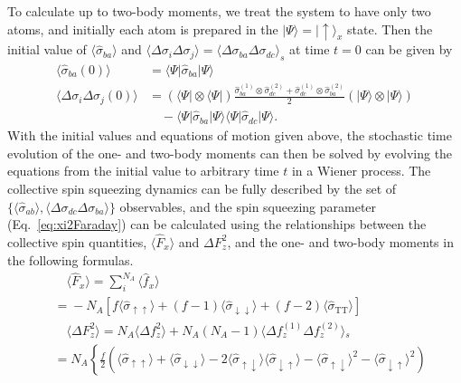 \documentclass[aps,pra,twocolumn,superscriptaddress]{revtex4-1} %
\def\bra#1{\langle{#1}\rvert}%
\def\ket#1{\lvert{#1}\rangle}%
\newcommand{\nn}{\nonumber}
\newcommand{\expect}[1]{\big\langle #1 \big\rangle}
\newcommand{\sigmauu}{\hat{\sigma}_{\uparrow\uparrow}}
\newcommand{\sigmaud}{\hat{\sigma}_{\uparrow\downarrow}}
\newcommand{\sigmadu}{\hat{\sigma}_{\downarrow\uparrow}}
\newcommand{\sigmadd}{\hat{\sigma}_{\downarrow\downarrow}}
\newcommand{\sigmatt}{\hat{\sigma}_{\mathrm{T}\mathrm{T}}}
\begin{document}
\begin{appendix}
To calculate up to two-body moments, we treat the system to have only two atoms, and initially each atom is prepared in the $ \ket{\Psi}=\ket{\uparrow}_x $ state. Then the initial value of $ \expect{\hat{\sigma}_{ba} } $ and $ \expect{\Delta\sigma_i\Delta\sigma_j}=\expect{\Delta\sigma_{ba}\Delta\sigma_{dc}}_s $ at time $ t=0 $ can be given by
\begin{subequations}
\begin{align}
\expect{\hat{\sigma}_{ba}(0)}&=\bra{\Psi}\hat{\sigma}_{ba}\ket{\Psi}\\
\expect{\!\Delta\sigma\!_i\Delta\sigma\!_j(0)} &=\! (\bra{\Psi}\!\otimes\!\bra{\Psi})\frac{\hat{\sigma}_{ba}^{(\!1\!)} \!\otimes\!\hat{\sigma}_{dc}^{(\!2\!)}\!+\!\hat{\sigma}_{dc}^{(\!1\!)} \!\otimes\!\hat{\sigma}_{ba}^{(\!2\!)}}{2}(\ket{\Psi}\!\otimes\!\ket{\Psi}\!)\nn\\
&\quad-\bra{\Psi}\hat{\sigma}_{ba}\ket{\Psi}\bra{\Psi}\hat{\sigma}_{dc}\ket{\Psi}.
\end{align}
\end{subequations}
With the initial values and equations of motion given above, the stochastic time evolution of the one- and two-body moments can then be solved by evolving the equations from the initial value to arbitrary time $ t $ in a Wiener process. The collective spin squeezing dynamics can be fully described by the set of $ \{\expect{\hat{\sigma}_{ab}},\expect{\Delta\sigma_{dc}\Delta\sigma_{ba}}\} $ observables, and the spin squeezing parameter (Eq.~\eqref{eq:xi2Faraday}) can be calculated using the relationships between the collective spin quantities, $ \expect{\hat{F}_x} $ and $ \Delta F_z^2 $, and the one- and two-body moments in the following formulas.
\begin{subequations}
	\begin{align}
	&\quad \expect{\hat{F}_x} = \sum_i^{N_A}\expect{\hat{f}_x}\nonumber\\
	&= \!-N_A\! \left[f\expect{\!\sigmauu\!}\!+\!(f\!-\!1)\expect{\!\sigmadd\!}\!+\!(f\!-\!2)\expect{\!\sigmatt\! } \right]\label{eq:Fx_qutrit}\\
	&\quad\expect{\Delta F_z^2} = \!N\!_A\expect{\!\Delta f_z^2} \!+\! N\!_A(N\!_A\!-\!1)\expect{\!\Delta f_z^{(\!1\!)}\!\Delta f_z^{(\!2\!)\!} }\!_s\label{eq:DeltaFz2_fz}\\
	&=\!N_A\!\left\{\! \frac{f}{2}\!\left(\!\expect{\!\sigmauu\!}\!+\!\expect{\!\sigmadd}\!-\!2\expect{\!\sigmaud}\expect{\!\sigmadu\!}\!-\!\expect{\!\sigmaud}^2\!-\!\expect{\!\sigmadu\!}^2 \right)\right. \nn\\

\end{align}
\end{subequations}
\end{appendix}
\end{document}
